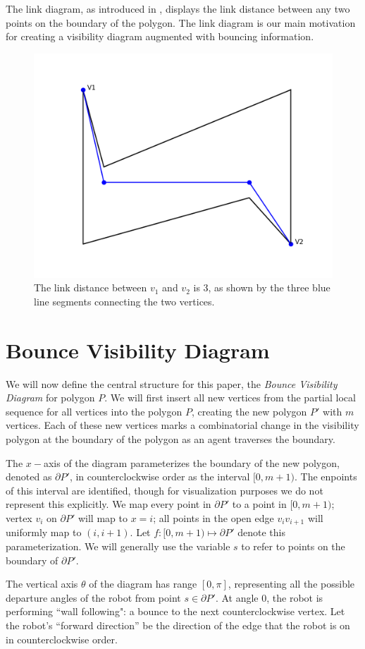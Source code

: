 \documentclass[]{styles/svproc}  %
\begin{document}
The link diagram, as introduced in \cite{tan_sweep}, displays the link distance between any two points on the boundary of the polygon. The link diagram is our main motivation for creating a visibility diagram augmented with bouncing information.
\begin{figure}
    \includegraphics[width=0.6\linewidth]{figures/link_distance.png}
    \centering
    \caption{The link distance between $v_1$ and $v_2$ is 3, as shown by the three blue line segments connecting the two vertices.}\label{fig:link_dis}
    \centering
\end{figure}

\section{Bounce Visibility Diagram \label{bvd_def}}
We will now define the central structure for this paper, the
\textit{Bounce Visibility Diagram} for polygon $P$. We will first insert all new
vertices from the partial local sequence for all vertices into the
polygon $P$, creating the new polygon $P'$ with $m$ vertices. Each of these new
vertices marks a combinatorial change in the visibility polygon at the boundary
of the polygon as an agent traverses the boundary.

The $x-$axis of the diagram parameterizes the boundary of the new polygon,
denoted as $\partial P'$, in counterclockwise order as the interval $[0, m+1)$. The
enpoints of this interval are identified, though for visualization purposes we
do not represent this explicitly. We map every
point in $\partial P'$ to a point in $[0, m+1)$; vertex $v_i$ on $\partial P'$
will map to $x = i$; all points in the open edge $v_iv_{i+1}$ will uniformly map
to $(i, i+1)$. Let $f: [0, m+1)\mapsto \partial P'$ denote this
parameterization. We will generally use the variable $s$ to refer to points on
the boundary of $\partial P'$.

The vertical axis $\theta$ of the diagram has range $[0, \pi]$, representing all
the possible departure angles of the robot from point $s \in \partial P'$. 
At angle $0$, the robot is performing ``wall following": a bounce
to the next counterclockwise vertex.
Let the robot's ``forward direction'' be the direction of the edge that the
robot is on in counterclockwise order.
\end{document}
